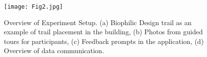 \begin{figure}
\begin{center}
\texttt{[image: Fig2.jpg]}
\caption{Overview of Experiment Setup. (a) Biophilic Design trail as an example of trail placement in the building, (b) Photos from guided tours for participants, (c) Feedback prompts in the application, (d) Overview of data communication.}
\label{fig:experiments}
\end{center}
\end{figure}






